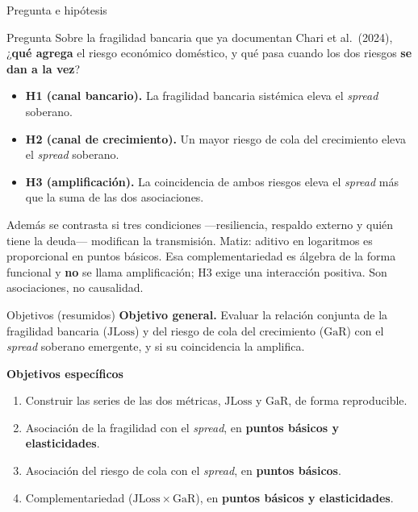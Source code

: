 \documentclass[aspectratio=169]{beamer}
\newcommand{\JLoss}{\mathrm{JLoss}}
\newcommand{\GaR}{\mathrm{GaR}}
\begin{document}
\begin{frame}{Pregunta e hipótesis}
\begin{block}{Pregunta}
Sobre la fragilidad bancaria que ya documentan Chari et al.\ (2024), ¿\textbf{qué agrega} el riesgo económico doméstico, y qué pasa cuando los dos riesgos \textbf{se dan a la vez}?
\end{block}
\vspace{4pt}
\begin{itemize}
\item \textbf{H1 (canal bancario).} La fragilidad bancaria sistémica eleva el \textit{spread} soberano.
\item \textbf{H2 (canal de crecimiento).} Un mayor riesgo de cola del crecimiento eleva el \textit{spread} soberano.
\item \textbf{H3 (amplificación).} La coincidencia de ambos riesgos eleva el \textit{spread} más que la suma de las dos asociaciones.
\end{itemize}
Además se contrasta si tres condiciones ---resiliencia, respaldo externo y quién tiene la deuda--- modifican la transmisión.
\vspace{4pt}
\footnotesize Matiz: aditivo en logaritmos es proporcional en puntos básicos. Esa complementariedad es álgebra de la forma funcional y \textbf{no} se llama amplificación; H3 exige una interacción positiva. Son asociaciones, no causalidad.
\end{frame}

\begin{frame}{Objetivos (resumidos)}
\textbf{Objetivo general.} Evaluar la relación conjunta de la fragilidad bancaria ($\JLoss$) y del riesgo de cola del crecimiento ($\GaR$) con el \textit{spread} soberano emergente, y si su coincidencia la amplifica.
\vspace{6pt}

\textbf{Objetivos específicos}
\begin{enumerate}\small
\item Construir las series de las dos métricas, $\JLoss$ y $\GaR$, de forma reproducible.
\item Asociación de la fragilidad con el \textit{spread}, en \textbf{puntos básicos y elasticidades}.
\item Asociación del riesgo de cola con el \textit{spread}, en \textbf{puntos básicos}.
\item Complementariedad ($\JLoss\times\GaR$), en \textbf{puntos básicos y elasticidades}.
\end{enumerate}
\end{frame}
\end{document}
